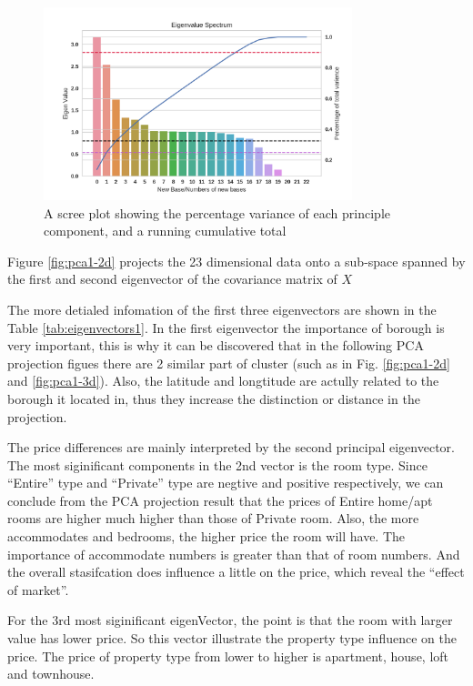 \documentclass[12pt]{article}
\begin{document}
\begin{figure}[htb]
\centering
\includegraphics[width = 0.8\textwidth]{images/eigenvalues1.png}
\caption{ A scree plot showing the percentage variance of each principle component, and a running cumulative total}
\label{fig:eigenvalues1}
\end{figure}
\par Figure \ref{fig:pca1-2d} projects the 23 dimensional data onto a sub-space spanned by the first and second eigenvector of the covariance matrix of $X$
\par The more detialed infomation of the first three eigenvectors are shown in the Table \ref{tab:eigenvectors1}.
In the first eigenvector the importance of borough is very important, this is why it can be discovered that in the following PCA projection figues there are 2 similar part of cluster (such as in Fig. \ref{fig:pca1-2d} and \ref{fig:pca1-3d}). Also, the latitude and longtitude are actully related to the borough it located in, thus they increase the distinction or distance in the projection. \par
The price differences are mainly interpreted by the second principal eigenvector. The most siginificant components in the 2nd vector is the room type. Since ``Entire'' type and ``Private'' type are negtive and positive respectively, we can conclude from the PCA projection result that the prices of Entire home/apt rooms are higher much higher than those of Private room. Also, the more accommodates and bedrooms, the higher price the room will have. The importance of accommodate numbers is greater than that of room numbers. And the overall stasifcation does influence a little on the price, which reveal the ``effect of market''.\par
For the 3rd most siginificant eigenVector, the point is that the room with larger value has lower price. So this vector illustrate the property type influence on the price. The price of property type from lower to higher is apartment, house, loft and townhouse.
\end{document}

